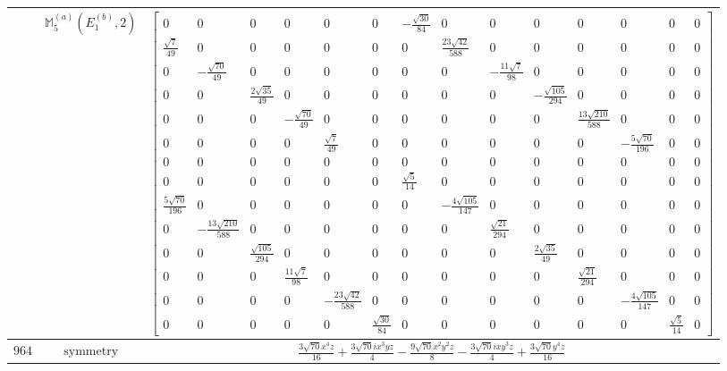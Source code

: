 \documentclass[fleqn,8pt,landscape]{jsarticle}
\begin{document}
\begin{longtable}{ccc}
$  $ & $ \mathbb{M}_{5}^{(a)}(E_{1}^{(b)},2) $ & $ \begin{bmatrix} 0 & 0 & 0 & 0 & 0 & 0 & - \frac{\sqrt{30}}{84} & 0 & 0 & 0 & 0 & 0 & 0 & 0 \\ \frac{\sqrt{7}}{49} & 0 & 0 & 0 & 0 & 0 & 0 & \frac{23 \sqrt{42}}{588} & 0 & 0 & 0 & 0 & 0 & 0 \\ 0 & - \frac{\sqrt{70}}{49} & 0 & 0 & 0 & 0 & 0 & 0 & - \frac{11 \sqrt{7}}{98} & 0 & 0 & 0 & 0 & 0 \\ 0 & 0 & \frac{2 \sqrt{35}}{49} & 0 & 0 & 0 & 0 & 0 & 0 & - \frac{\sqrt{105}}{294} & 0 & 0 & 0 & 0 \\ 0 & 0 & 0 & - \frac{\sqrt{70}}{49} & 0 & 0 & 0 & 0 & 0 & 0 & \frac{13 \sqrt{210}}{588} & 0 & 0 & 0 \\ 0 & 0 & 0 & 0 & \frac{\sqrt{7}}{49} & 0 & 0 & 0 & 0 & 0 & 0 & - \frac{5 \sqrt{70}}{196} & 0 & 0 \\ 0 & 0 & 0 & 0 & 0 & 0 & 0 & 0 & 0 & 0 & 0 & 0 & 0 & 0 \\ 0 & 0 & 0 & 0 & 0 & 0 & \frac{\sqrt{5}}{14} & 0 & 0 & 0 & 0 & 0 & 0 & 0 \\ \frac{5 \sqrt{70}}{196} & 0 & 0 & 0 & 0 & 0 & 0 & - \frac{4 \sqrt{105}}{147} & 0 & 0 & 0 & 0 & 0 & 0 \\ 0 & - \frac{13 \sqrt{210}}{588} & 0 & 0 & 0 & 0 & 0 & 0 & \frac{\sqrt{21}}{294} & 0 & 0 & 0 & 0 & 0 \\ 0 & 0 & \frac{\sqrt{105}}{294} & 0 & 0 & 0 & 0 & 0 & 0 & \frac{2 \sqrt{35}}{49} & 0 & 0 & 0 & 0 \\ 0 & 0 & 0 & \frac{11 \sqrt{7}}{98} & 0 & 0 & 0 & 0 & 0 & 0 & \frac{\sqrt{21}}{294} & 0 & 0 & 0 \\ 0 & 0 & 0 & 0 & - \frac{23 \sqrt{42}}{588} & 0 & 0 & 0 & 0 & 0 & 0 & - \frac{4 \sqrt{105}}{147} & 0 & 0 \\ 0 & 0 & 0 & 0 & 0 & \frac{\sqrt{30}}{84} & 0 & 0 & 0 & 0 & 0 & 0 & \frac{\sqrt{5}}{14} & 0 \end{bmatrix} $ \\ \hline
$ 964 $ & $ \text{symmetry} $ & $ \frac{3 \sqrt{70} x^{4} z}{16} + \frac{3 \sqrt{70} i x^{3} y z}{4} - \frac{9 \sqrt{70} x^{2} y^{2} z}{8} - \frac{3 \sqrt{70} i x y^{3} z}{4} + \frac{3 \sqrt{70} y^{4} z}{16} $ \\

\end{longtable}
\end{document}
